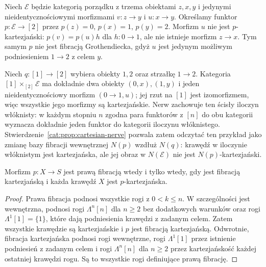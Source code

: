 \begin{przyklad}\label{cat:ex:inner-base-change-not-reflect}
Niech $\mathcal E$ będzie kategorią porządku z trzema obiektami $z,x,y$ i jedynymi nieidentycznościowymi morfizmami $v:z\to y$ i $u:x\to y$. Określamy funktor $p:\mathcal E\to[2]$ przez $p(z)=0$, $p(x)=1$, $p(y)=2$. Morfizm $u$ nie jest $p$-kartezjański: $p(v)=p(u)h$ dla $h:0\to1$, ale nie istnieje morfizm $z\to x$. Tym samym $p$ nie jest fibracją Grothendiecka, gdyż $u$ jest jedynym możliwym podniesieniem $1\to2$ z celem $y$.

Niech $q:[1]\to[2]$ wybiera obiekty $1,2$ oraz strzałkę $1\to2$. Kategoria $[1]\times_{[2]}\mathcal E$ ma dokładnie dwa obiekty $(0,x),(1,y)$ i jeden nieidentycznościowy morfizm $(0\to1,u)$; jej rzut na $[1]$ jest izomorfizmem, więc wszystkie jego morfizmy są kartezjańskie. Nerw zachowuje ten ścisły iloczyn włóknisty: w każdym stopniu $n$ zgodna para funktorów z $[n]$ do obu kategorii wyznacza dokładnie jeden funktor do kategorii iloczynu włóknistego. Stwierdzenie~\ref{cat:prop:cartesian-nerve} pozwala zatem odczytać ten przykład jako zmianę bazy fibracji wewnętrznej $N(p)$ wzdłuż $N(q)$: krawędź w iloczynie włóknistym jest kartezjańska, ale jej obraz w $N(\mathcal E)$ nie jest $N(p)$-kartezjański.
\end{przyklad}

\begin{stwierdzenie}\label{cat:prop:right-cartesian-all}
Morfizm $p:X\to S$ jest prawą fibracją wtedy i tylko wtedy, gdy jest fibracją kartezjańską i każda krawędź $X$ jest $p$-kartezjańska.
\end{stwierdzenie}
\begin{proof}
Prawa fibracja podnosi wszystkie rogi z $0<k\leq n$. W szczególności jest wewnętrzna, podnosi rogi $\Lambda^n[n]$ dla $n\geq2$ bez dodatkowych warunków oraz rogi $\Lambda^1[1]=\{1\}$, które dają podniesienia krawędzi z zadanym celem. Zatem wszystkie krawędzie są kartezjańskie i $p$ jest fibracją kartezjańską. Odwrotnie, fibracja kartezjańska podnosi rogi wewnętrzne, rogi $\Lambda^1[1]$ przez istnienie podniesień z zadanym celem i rogi $\Lambda^n[n]$ dla $n\geq2$ przez kartezjańskość każdej ostatniej krawędzi rogu. Są to wszystkie rogi definiujące prawą fibrację.
\end{proof}

